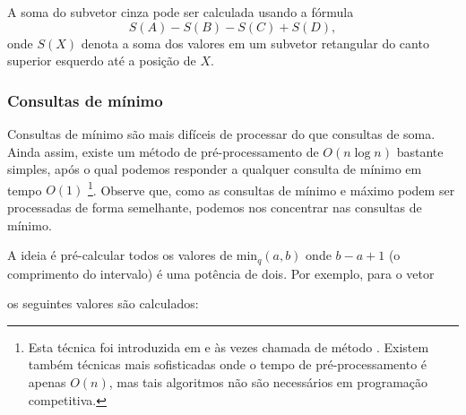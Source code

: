 A soma do subvetor cinza pode ser calculada
usando a fórmula
\[S(A) - S(B) - S(C) + S(D),\]
onde $S(X)$ denota a soma dos valores
em um subvetor retangular
do canto superior esquerdo
até a posição de $X$.

\subsubsection{Consultas de mínimo}


Consultas de mínimo são mais difíceis de processar
do que consultas de soma.
Ainda assim, existe um método de pré-processamento de $O(n \log n)$ bastante simples, após o qual podemos responder a qualquer consulta de mínimo
em tempo $O(1)$ \footnote {Esta técnica
foi introduzida em \cite{ben00} e às vezes
chamada de método .
Existem também técnicas mais sofisticadas \cite{fis06} onde
o tempo de pré-processamento é apenas $O(n)$, mas tais algoritmos
não são necessários em programação competitiva.}.
Observe que, como as consultas de mínimo e máximo podem
ser processadas de forma semelhante,
podemos nos concentrar nas consultas de mínimo.

A ideia é pré-calcular todos os valores de
$\textrm{min}_q(a,b)$ onde
$b-a+1$ (o comprimento do intervalo) é uma potência de dois.
Por exemplo, para o vetor

\begin{center}
\end{center}
os seguintes valores são calculados:

